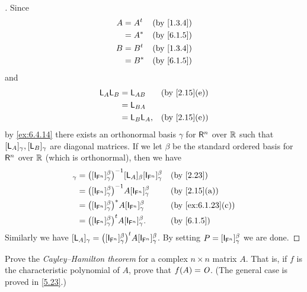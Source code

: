 \begin{proof}[]
	Since
	\begin{align*}
		A & = \tp{A} &  & \by{1.3.4} \\
		  & = A^*    &  & \by{6.1.5} \\
		B & = \tp{B} &  & \by{1.3.4} \\
		  & = B^*    &  & \by{6.1.5}
	\end{align*}
	and
	\begin{align*}
		\L_A \L_B & = \L_{AB}    &  & \by{2.15}[e] \\
		          & = \L_{BA}                      \\
		          & = \L_B \L_A, &  & \by{2.15}[e]
	\end{align*}
	by \cref{ex:6.4.14} there exists an orthonormal basis \(\gamma\) for \(\mathsf{R}^n\) over \(\mathbb{R}\) such that \([\mathsf{L}_A]_{\gamma}, [\mathsf{L}_B]_{\gamma}\) are diagonal matrices.
	If we let \(\beta\) be the standard ordered basis for \(\mathsf{R}^n\) over \(\mathbb{R}\) (which is orthonormal), then we have
	\begin{align*}
		[\L_A]_{\gamma} & = \pa{[\IT[\vs{F}^n]]_{\gamma}^{\beta}}^{-1} [\L_A]_{\beta} [\IT[\vs{F}^n]]_{\gamma}^{\beta} &  & \by{2.23}         \\
		                & = \pa{[\IT[\vs{F}^n]]_{\gamma}^{\beta}}^{-1} A [\IT[\vs{F}^n]]_{\gamma}^{\beta}              &  & \by{2.15}[a]      \\
		                & = \pa{[\IT[\vs{F}^n]]_{\gamma}^{\beta}}^* A [\IT[\vs{F}^n]]_{\gamma}^{\beta}                 &  & \by{ex:6.1.23}[c] \\
		                & = \tp{\pa{[\IT[\vs{F}^n]]_{\gamma}^{\beta}}} A [\IT[\vs{F}^n]]_{\gamma}^{\beta}.             &  & \by{6.1.5}
	\end{align*}
	Similarly we have \([\L_A]_{\gamma} = \tp{\pa{[\IT[\vs{F}^n]]_{\gamma}^{\beta}}} A [\IT[\vs{F}^n]]_{\gamma}^{\beta}\).
	By setting \(P = [\IT[\vs{F}^n]]_{\gamma}^{\beta}\) we are done.
\end{proof}

\begin{ex}\label{ex:6.4.16}
	Prove the \emph{Cayley--Hamilton theorem} for a complex \(n \times n\) matrix \(A\).
	That is, if \(f\) is the characteristic polynomial of \(A\), prove that \(f(A) = \mathit{O}\).
	(The general case is proved in \cref{5.23}.)
\end{ex}

